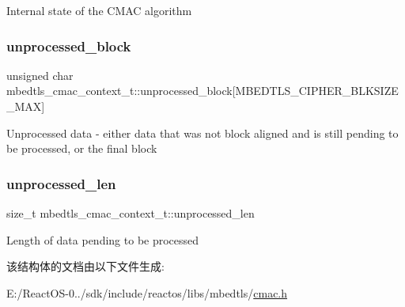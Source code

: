 Internal state of the C\+M\+AC algorithm \mbox{\label{structmbedtls__cmac__context__t_a2d58c18be7180b1284a06f2a29291663}} 
\subsubsection{\texorpdfstring{unprocessed\+\_\+block}{unprocessed\_block}}
{\footnotesize\ttfamily unsigned char mbedtls\+\_\+cmac\+\_\+context\+\_\+t\+::unprocessed\+\_\+block\mbox{[}M\+B\+E\+D\+T\+L\+S\+\_\+\+C\+I\+P\+H\+E\+R\+\_\+\+B\+L\+K\+S\+I\+Z\+E\+\_\+\+M\+AX\mbox{]}}

Unprocessed data -\/ either data that was not block aligned and is still pending to be processed, or the final block \mbox{\label{structmbedtls__cmac__context__t_a96b77ca1c7dba6980356a37086870fab}} 
\subsubsection{\texorpdfstring{unprocessed\+\_\+len}{unprocessed\_len}}
{\footnotesize\ttfamily size\+\_\+t mbedtls\+\_\+cmac\+\_\+context\+\_\+t\+::unprocessed\+\_\+len}

Length of data pending to be processed 

该结构体的文档由以下文件生成\+:\begin{DoxyCompactItemize}
\item 
E\+:/\+React\+O\+S-\/0../sdk/include/reactos/libs/mbedtls/\hyperlink{cmac_8h}{cmac.\+h}\end{DoxyCompactItemize}
